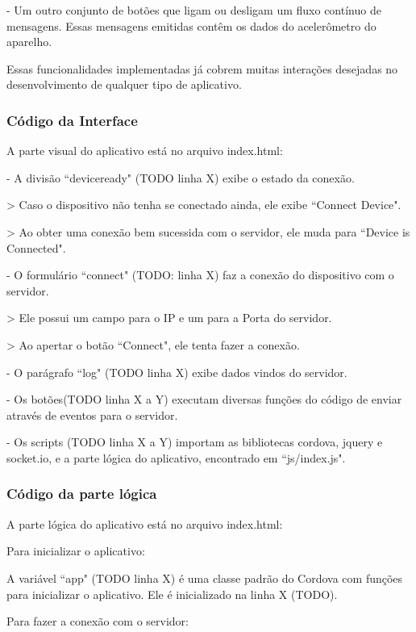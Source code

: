 \documentclass[a4paper,12pt]{article}
\begin{document}
- Um outro conjunto de botões que ligam ou desligam um fluxo contínuo de mensagens. Essas mensagens emitidas contêm os dados do acelerômetro do aparelho.

Essas funcionalidades implementadas já cobrem muitas interações desejadas no desenvolvimento de qualquer tipo de aplicativo.


\subsubsection{Código da Interface}
A parte visual do aplicativo está no arquivo index.html:


- A divisão “deviceready" (TODO linha X) exibe o estado da conexão.

> Caso o dispositivo não tenha se conectado ainda, ele exibe “Connect Device".

> Ao obter uma conexão bem sucessida com o servidor, ele muda para “Device is Connected".


- O formulário “connect" (TODO: linha X) faz a conexão do dispositivo com o servidor.

> Ele possui um campo para o IP e um para a Porta do servidor.

> Ao apertar o botão “Connect", ele tenta fazer a conexão.


- O parágrafo “log" (TODO linha X) exibe dados vindos do servidor.

- Os botões(TODO linha X a Y) executam diversas funções do código de enviar através de eventos para o servidor.

- Os scripts (TODO linha X a Y) importam as bibliotecas cordova, jquery e socket.io, e a parte lógica do aplicativo, encontrado em “js/index.js".


\subsubsection{Código da parte lógica}

A parte lógica do aplicativo está no arquivo index.html:



Para inicializar o aplicativo:

A variável “app" (TODO linha X) é uma classe padrão do Cordova com funções para inicializar o aplicativo. Ele é inicializado na linha X (TODO).


Para fazer a conexão com o servidor:
\end{document}
